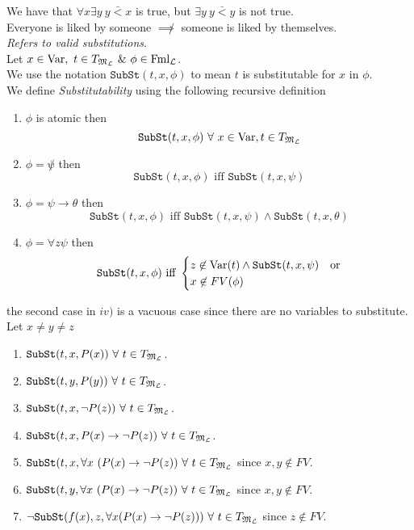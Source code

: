 \documentclass[11pt,a4paper]{article}
\begin{document}
We have that $\forall x\exists y\ y\bar<x$ is true, but $\exists y\ y\bar<y$ is not true.\\
\ie Everyone is liked by someone $\not\implies$ someone is liked by themselves.\\

\textit{Refers to valid substitutions}.\\
Let $x\in\var,\ t\in T_{\M_\LL}\ \&\ \phi\in\text{Fml}_\LL$.\\
We use the notation $\mathtt{SubSt}(t,x,\phi)$ to mean $t$ is substitutable for $x$ in $\phi$.\\
We define \textit{Substitutability} using the following recursive definition
\begin{enumerate}
	\item $\phi$ is atomic then
	$$\mathtt{SubSt}(t,x,\phi)\ \forall\ x\in\var,t\in T_{\M_\LL}$$
	\item $\phi=\not\psi$ then
	$$\mathtt{SubSt}(t,x,\phi)\text{ iff }\mathtt{SubSt}(t,x,\psi)$$
	\item $\phi=\psi\to\theta$ then
	$$\mathtt{SubSt}(t,x,\phi)\text{ iff }\mathtt{SubSt}(t,x,\psi)\wedge\mathtt{SubSt}(t,x,\theta)$$
	\item $\phi=\forall z\psi$ then
	$$\mathtt{SubSt}(t,x,\phi)\text{ iff }\begin{cases}z\not\in\mathrm{Var}(t)\wedge\mathtt{SubSt}(t,x,\psi)&\text{or}\\x\not\in FV(\phi)\end{cases}$$
\end{enumerate}
\nb the second case in $iv)$ is a vacuous case since there are no variables to substitute.\\

Let $x\neq y\neq z$
\begin{enumerate}
	\item $\mathtt{SubSt}(t,x,P(x))\ \forall\ t\in T_{\M_\LL}$.
	\item $\mathtt{SubSt}(t,y,P(y))\ \forall\ t\in T_{\M_\LL}$.
	\item $\mathtt{SubSt}(t,x,\neg P(z))\ \forall\ t\in T_{\M_\LL}$.
	\item $\mathtt{SubSt}(t,x,P(x)\to\neg P(z))\ \forall\ t\in T_{\M_\LL}$.
	\item $\mathtt{SubSt}(t,x,\forall x\ (P(x)\to\neg P(z))\ \forall\ t\in T_{\M_\LL}$ since $x,y\not\in FV$.
	\item $\mathtt{SubSt}(t,y,\forall x\ (P(x)\to\neg P(z))\ \forall\ t\in T_{\M_\LL}$ since $x,y\not\in FV$.
	\item $\neg\mathtt{SubSt}(f(x),z,\forall x(P(x)\to\neg P(z)))\ \forall\ t\in T_{\mathfrak{M}_{\mathcal{L}}}$ since $z\not\in FV$.
\end{enumerate}
\end{document}
